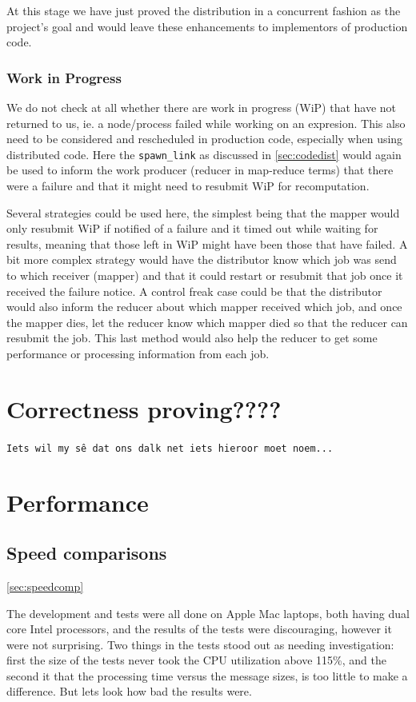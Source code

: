 \documentclass[a4paper,11pt]{report}
\begin{document}
At this stage we have just proved the distribution in a concurrent
fashion as the project's goal and would leave these enhancements to
implementors of production code.

\subsection{Work in Progress}

We do not check at all whether there are work in progress (WiP) that
have not returned to us, ie. a node/process failed while working on an
expresion. This also need to be considered and rescheduled in
production code, especially when using distributed code. Here the
\texttt{spawn\_link} as discussed in \ref{sec:codedist} would again be
used to inform the work producer (reducer in map-reduce terms) that
there were a failure and that it might need to resubmit WiP for
recomputation.

Several strategies could be used here, the simplest being that the
mapper would only resubmit WiP if notified of a failure and it timed
out while waiting for results, meaning that those left in WiP might
have been those that have failed. A bit more complex strategy would
have the distributor know which job was send to which receiver
(mapper) and that it could restart or resubmit that job once it
received the failure notice. A control freak case could be that the
distributor would also inform the reducer about which mapper received
which job, and once the mapper dies, let the reducer know which mapper
died so that the reducer can resubmit the job. This last method would
also help the reducer to get some performance or processing
information from each job.

\chapter{Correctness proving????}

\texttt{Iets wil my s\^e dat ons dalk net iets hieroor moet noem...
}

\chapter{Performance}
\section{Speed comparisons}
\ref{sec:speedcomp}

The development and tests were all done on Apple Mac laptops, both
having dual core Intel processors, and the results of the tests were
discouraging, however it were not surprising. Two things in the tests
stood out as needing investigation: first the size of the tests never
took the CPU utilization above 115\%, and the second it that the
processing time versus the message sizes, is too little to make a
difference. But lets look how bad the results were.
\end{document}
